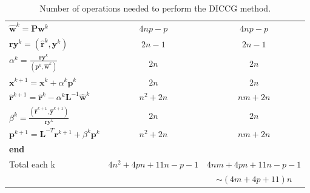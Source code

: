 \documentclass[12pt]{article}
\begin{document}
\begin{table}[!h]
\begin{tabular}{ |l|c|c| }
 \hspace{1cm}$\hat{\mathbf{w}}^k=\mathbf{P}\mathbf{w}^k$&$4np-p$&$4np-p$\\
 \hspace{1cm} $\mathbf{ry}^{k}=(\hat{\mathbf{r}}^{k},\mathbf{y}^{k})$&$2n-1$&$2n-1$\\
 \hspace{1cm} $\alpha^k=\frac{\mathbf{ry}^{k}}{(\mathbf{p}^k,\hat{\mathbf{w}}^k)}$&$2n$&$2n$\\
\hspace{1cm} $\mathbf{x}^{k+1}=\mathbf{x}^k+\alpha^k\mathbf{p}^k$&$2n$&$2n$\\
\hspace{1cm}$\hat{\mathbf{r}}^{k+1}=\hat{\mathbf{r}}^k-\alpha^k\mathbf{L}^{-1}\hat{\mathbf{w}}^k$&$n^2+2n$&$nm+2n$\\
\hspace{1cm}$ \beta^k=\frac{(\hat{\mathbf{r}}^{k+1},\hat{\mathbf{y}}^{k+1})}{\mathbf{ry}^{k}}$&$2n$&$2n$\\
\hspace{1cm}$\mathbf{p}^{k+1}=\mathbf{L}^{-T}\mathbf{r}^{k+1}+\beta^k\mathbf{p}^k$&$n^2+2n$&$nm+2n$\\
\hspace{0.5cm}\textbf{end}&&\\
Total each k&$4n^2+4pn+11n-p-1$&$4nm+4pn+11n-p-1$\\
&&$\sim (4m+4p+11)n$\\


\hline
\end{tabular}\caption{Number of operations needed to perform the DICCG method.}\label{table:nod}
\end{table}



\newpage
\end{document}
